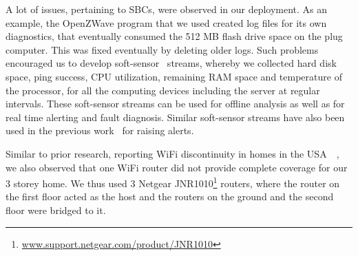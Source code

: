 \documentclass[10pt]{sensys-proc}
\newcommand{\secref}[1]{Section~\ref{#1}}
\begin{document}


A lot of issues, pertaining to SBCs, were observed in our deployment. As an example, the OpenZWave program that we used created log files for its own diagnostics, that eventually consumed the 512 MB flash drive space on the plug computer. This was fixed eventually by deleting older logs. Such problems encouraged us to develop soft-sensor~\cite{softgreen} streams, whereby we collected hard disk space, ping success, CPU utilization, remaining RAM space and temperature of the processor, for all the computing devices including the server at regular intervals. These soft-sensor streams can be used for offline analysis as well as for real time alerting and fault diagnosis. Similar soft-sensor streams have also been used in the previous work~\cite{hitchhiker_residential} for raising alerts.

Similar to prior research, reporting WiFi discontinuity in homes in the USA~~\cite{hitchhiker_residential}, we also observed that one WiFi router did not provide complete coverage for our 3 storey home. We thus used 3 Netgear JNR1010\footnote{\url{www.support.netgear.com/product/JNR1010}} routers, where the router on the first floor acted as the host and the routers on the ground and the second floor were bridged to it. %
\end{document}
